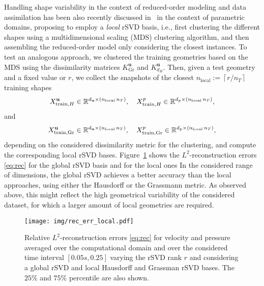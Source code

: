 Handling shape variability in the context of reduced-order modeling and data assimilation has been also recently discussed in~\cite{galarce2022state} in the context of parametric domains, 
proposing to employ  a \textit{local} rSVD basis, i.e., first clustering the different shapes using a multidimensional scaling (MDS) clustering algorithm, and then assembling the reduced-order model only considering the closest instances.
%
To test an analogous approach, we clustered the training geometries based on the MDS using the dissimilarity matrices $K^{\mathbf u}_{\text{Gr}}$ and $K^{\mathbf u}_{d_{H}}$. Then, given a test geometry
and a fixed value or $r$, we collect the snapshots of the closest $n_{\text{local}}:=\left\lceil r/n_T \right \rceil$ training shapes 
\begin{equation}
  \label{eq:trainsnap}
X^{\mathbf u}_{\text{train}, H}\in\mathbb{R}^{d_{\mathbf u} \times(n_{\text{local}}\,n_T)},\quad X^p_{\text{train}, H}\in\mathbb{R}^{d_p\times(n_{\text{local}}\,n_T)} ,
\end{equation}
and
\begin{equation}
X^{\mathbf u}_{\text{train}, {\rm Gr}}\in\mathbb{R}^{d_{\mathbf u} \times(n_{\text{local}}\,n_T)},\quad X^p_{\text{train}, {\rm Gr}}\in\mathbb{R}^{d_p\times(n_{\text{local}}\,n_T)} ,
\end{equation}
depending on the considered dissimilarity metric for the clustering, and compute the corresponding local rSVD bases.
Figure~\ref{fig:reclocal} shows the $L^2$-reconstruction errors \eqref{eq:rec} for the global rSVD basis and for the local ones
In the considered range of dimensions, the global rSVD achieves a better accuracy than the local approaches, using either the Hausdorff or the Grassmann metric. 
As observed above, this might reflect the high geometrical variability of the considered dataset, for which a larger amount of local geometries are required. 

%
\begin{figure}[!htp]
  \centering
  \texttt{[image: img/rec\_err\_local.pdf]}
  \caption{Relative $L^2$-reconstruction errors \eqref{eq:rec} for velocity and pressure averaged over the computational domain and over the considered
  time interval $[0.05s,0.25]$ varying the rSVD rank $r$ and considering a global rSVD and local Hausdorff and Grassman rSVD bases.
	The $25\%$ and $75\%$ percentile are also shown.}
  \label{fig:reclocal}
\end{figure}

